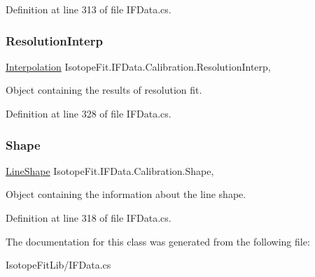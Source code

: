 Definition at line 313 of file I\+F\+Data.\+cs.

\mbox{\label{class_isotope_fit_1_1_i_f_data_1_1_calibration_ab8db2fa10ee3de8f8deca251f4bd3518}} 
\subsubsection{\texorpdfstring{Resolution\+Interp}{ResolutionInterp}}
{\footnotesize\ttfamily \hyperlink{class_isotope_fit_1_1_interpolation}{Interpolation} Isotope\+Fit.\+I\+F\+Data.\+Calibration.\+Resolution\+Interp\hspace{0.3cm}{\ttfamily [get]}, {\ttfamily [set]}}



Object containing the results of resolution fit. 



Definition at line 328 of file I\+F\+Data.\+cs.

\mbox{\label{class_isotope_fit_1_1_i_f_data_1_1_calibration_ad0c3e0969448ad0cc57307c77c2222eb}} 
\subsubsection{\texorpdfstring{Shape}{Shape}}
{\footnotesize\ttfamily \hyperlink{class_isotope_fit_1_1_i_f_data_1_1_calibration_1_1_line_shape}{Line\+Shape} Isotope\+Fit.\+I\+F\+Data.\+Calibration.\+Shape\hspace{0.3cm}{\ttfamily [get]}, {\ttfamily [set]}}



Object containing the information about the line shape. 



Definition at line 318 of file I\+F\+Data.\+cs.



The documentation for this class was generated from the following file\+:\begin{DoxyCompactItemize}
\item 
Isotope\+Fit\+Lib/I\+F\+Data.\+cs\end{DoxyCompactItemize}
